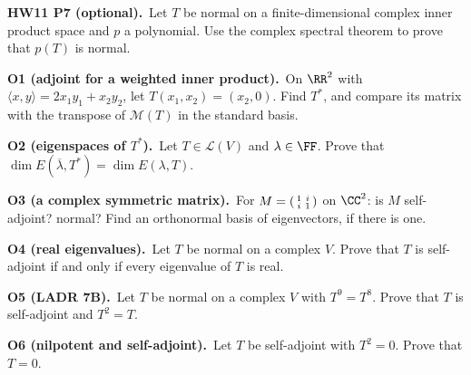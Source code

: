 \documentclass[10pt]{scrartcl}
\newcommand{\LL}{\mathcal L}\newcommand{\PP}{\mathcal P}\newcommand{\MM}{\mathcal M}
\begin{document}
\begin{prob}
  \textbf{HW11 P7 (optional).}\ Let $T$ be normal on a finite-dimensional complex inner product space and $p$ a polynomial. Use the complex spectral theorem to prove that $p(T)$ is normal.
\end{prob}

\begin{prob}
  \textbf{O1 (adjoint for a weighted inner product).}\ On $\RR^2$ with $\langle x,y\rangle=2x_1y_1+x_2y_2$, let $T(x_1,x_2)=(x_2,0)$. Find $T^*$, and compare its matrix with the transpose of $\MM(T)$ in the standard basis.
\end{prob}

\begin{prob}
  \textbf{O2 (eigenspaces of $T^*$).}\ Let $T\in\LL(V)$ and $\lambda\in\FF$. Prove that $\dim E(\overline{\lambda},T^*)=\dim E(\lambda,T)$.
\end{prob}

\begin{prob}
  \textbf{O3 (a complex symmetric matrix).}\ For $M=\begin{psmallmatrix}1&i\\i&1\end{psmallmatrix}$ on $\CC^2$: is $M$ self-adjoint? normal? Find an orthonormal basis of eigenvectors, if there is one.
\end{prob}

\begin{prob}
  \textbf{O4 (real eigenvalues).}\ Let $T$ be normal on a complex $V$. Prove that $T$ is self-adjoint if and only if every eigenvalue of $T$ is real.
\end{prob}

\begin{prob}
  \textbf{O5 (LADR 7B).}\ Let $T$ be normal on a complex $V$ with $T^9=T^8$. Prove that $T$ is self-adjoint and $T^2=T$.
\end{prob}

\begin{prob}
  \textbf{O6 (nilpotent and self-adjoint).}\ Let $T$ be self-adjoint with $T^2=0$. Prove that $T=0$.
\end{prob}
\end{document}
